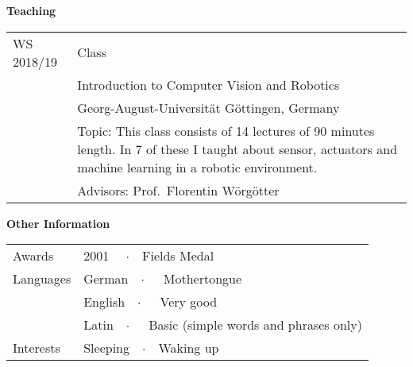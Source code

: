 \vspace{0.5cm}\textbf{Teaching}

\hspace{0.5cm}\begin{tabular}{ p{2.5cm} p{10.3cm} }
  WS 2018/19    & Class\\
                & Introduction to Computer Vision and Robotics\\
                & Georg-August-Universit\"at G\"ottingen, Germany\\
                & Topic: This class consists of 14 lectures of 90 minutes length. In 7 of these I taught about sensor, actuators and machine learning in a robotic environment.\\
                & Advisors: Prof.~Florentin W\"org\"otter\vspace{0.5cm}\\
\end{tabular}


\vspace{0.5cm}\textbf{Other Information}

\hspace{0.5cm}\begin{tabular}{ p{2.5cm} p{10.3cm} }
  Awards        & 2001 \ \ $\cdotp$\ \ Fields Medal\vspace{0.5cm}\\
  Languages     & German\ \ $\cdotp$\ \ \ Mothertongue\\
                & English\ \ $\cdotp$\ \ \ Very good\\
                & Latin\ \ $\cdotp$\ \ \ Basic (simple words and phrases only)\vspace{0.5cm}\\
 Interests      & Sleeping\ \ $\cdotp$\ \ Waking up\vspace{0.5cm}\\
\end{tabular}
